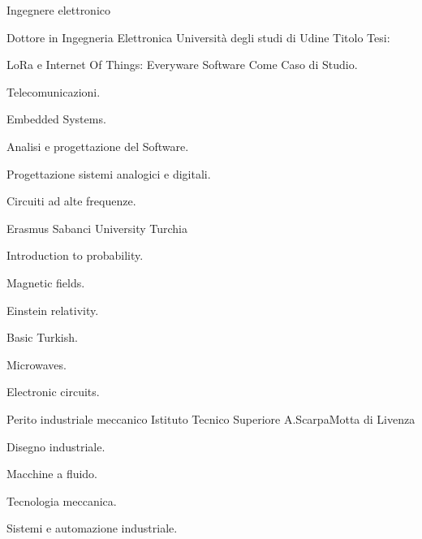 \documentclass[italian,a4paper]{europasscv}
\begin{document}
	\begin{europasscv}

	\ecvpersonalinfo
	 {
		Ingegnere elettronico
	}


		 {
			Dottore in Ingegneria Elettronica
		}
		\ecvitem{} {
			Università degli studi di Udine
		}
		\ecvitem{} {
			\textcolor{ecvhighlightcolor}{Titolo Tesi}:
		}
		\begin{center} {
			LoRa e Internet Of Things:\linebreak
			Everyware Software Come Caso di Studio.
		}
		\end{center}
		\ecvitem{} {
			\begin{ecvitemize}
				\item Telecomunicazioni.
				\item Embedded Systems.
				\item Analisi e progettazione del Software.
				\item Progettazione sistemi analogici e digitali.
				\item Circuiti ad alte frequenze.
			\end{ecvitemize}
		}

		 {
			Erasmus
		}
		\ecvitem{} {
			Sabanci University Turchia
		}
		\ecvitem{} {
			\begin{ecvitemize}
				\item Introduction to probability.
				\item Magnetic fields.
				\item Einstein relativity.
				\item Basic Turkish.
				\item Microwaves.
				\item Electronic circuits.
			\end{ecvitemize}
		}

		 {
			Perito industriale meccanico
		}
		\ecvitem{} {
			Istituto Tecnico Superiore A.Scarpa\newline Motta di Livenza
		}
		\ecvitem{} {
			\begin{ecvitemize}
				\item Disegno industriale.
				\item Macchine a fluido.
				\item Tecnologia meccanica.
				\item Sistemi e automazione industriale.
			\end{ecvitemize}
		}


\end{europasscv}
\end{document}
